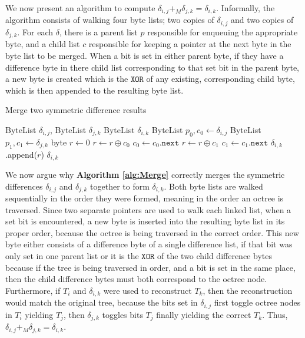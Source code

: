 \documentclass[twoside,twocolumn]{article}
\begin{document}
We now present an algorithm to compute $\delta_{i,j} +_M \delta_{j,k} = \delta_{i,k}$. Informally, the
algorithm consists of walking four byte lists; two copies of $\delta_{i,j}$ and two copies of
$\delta_{j,k}$. For each $\delta$, there is a parent list $p$ responsible for enqueuing the appropriate
byte, and a child list $c$ responsible for keeping a pointer at the next byte in the byte list to be
merged. When a bit is set in either parent byte, if they have a difference byte in there child list
corresponding to that set bit in the parent byte, a new byte is created which is the $\mathtt{XOR}$ of
any existing, corresponding child byte, which is then appended to the resulting byte list.

\begin{algorithm}[h]
\small
\caption{Merge two symmetric difference results}
\label{alg:Merge}
\begin{algorithmic}[1]
 {ByteList $\delta_{i,j}$, ByteList $\delta_{j,k}$}
  \State ByteList $\delta_{i,k}$
  \State ByteList $p_0, c_0 \gets \delta_{i,j}$
  \State ByteList $p_1, c_1 \gets \delta_{j,k}$
      \State byte $r \gets 0$
        \State $r \gets r \oplus c_0$
        \State $c_0 \gets c_0.\mathtt{next}$
      \EndIf
        \State $r \gets r \oplus c_1$
        \State $c_1 \gets c_1.\mathtt{next}$
      \EndIf
      \State $\delta_{i,k}$.append($r$)
    \EndFor
  \EndFor
  \State \Return $\delta_{i,k}$
\EndProcedure
\Statex
\end{algorithmic}
\vspace{-0.4cm}
\end{algorithm}

We now argue why \textbf{Algorithm \ref{alg:Merge}} correctly merges the symmetric differences
$\delta_{i,j}$ and $\delta_{j,k}$ together to form $\delta_{i,k}$. Both byte lists are walked sequentially
in the order they were formed, meaning in the order an octree is traversed. Since two separate pointers
are used to walk each linked list, when a set bit is encountered, a new byte is inserted into the resulting
byte list in its proper order, because the octree is being traversed in the correct order. This new byte
either consists of a difference byte of a single difference list, if that bit was only set in one parent
list or it is the $\mathtt{XOR}$ of the two child difference bytes because if the tree is being traversed
in order, and a bit is set in the same place, then the child difference bytes must both correspond to the
octree node. Furthermore, if $T_i$ and $\delta_{i,k}$ were used to reconstruct $T_k$, then the
reconstruction would match the original tree, because the bits set in $\delta_{i,j}$ first toggle octree
nodes in $T_i$ yielding $T_j$, then $\delta_{j,k}$ toggles bits $T_j$ finally yielding the correct $T_k$.
Thus, $\delta_{i,j} +_M \delta_{j,k} = \delta_{i,k}$.
\end{document}
